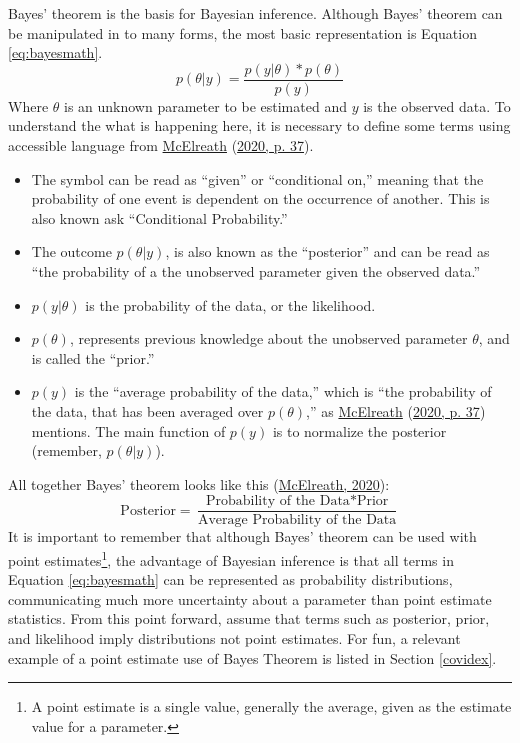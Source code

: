 \documentclass[12pt,twoside]{reedthesis}
\begin{document}
Bayes' theorem is the basis for Bayesian inference. Although Bayes' theorem can be manipulated in to many forms, the most basic representation is Equation \eqref{eq:bayesmath}.
\begin{equation}
p(\theta|y) = \frac{ p(y|\theta) * p(\theta)}{p(y)}
\label{eq:bayesmath}
\end{equation}
Where \(\theta\) is an unknown parameter to be estimated and \(y\) is the observed data. To understand the what is happening here, it is necessary to define some terms using accessible language from \protect\hyperlink{ref-mcelreathStatisticalRethinkingBayesian2020}{McElreath} (\protect\hyperlink{ref-mcelreathStatisticalRethinkingBayesian2020}{2020, p. 37}).
\begin{itemize}
\item
  The symbol \textbar{} can be read as ``given'' or ``conditional on,'' meaning that the probability of one event is dependent on the occurrence of another. This is also known ask ``Conditional Probability.''
\item
  The outcome \(p(\theta|y)\), is also known as the ``posterior'' and can be read as ``the probability of a the unobserved parameter given the observed data.''
\item
  \(p(y|\theta)\) is the probability of the data, or the likelihood.
\item
  \(p(\theta)\), represents previous knowledge about the unobserved parameter \(\theta\), and is called the ``prior.''
\item
  \(p(y)\) is the ``average probability of the data,'' which is ``the probability of the data, that has been averaged over \(p(\theta)\),'' as \protect\hyperlink{ref-mcelreathStatisticalRethinkingBayesian2020}{McElreath} (\protect\hyperlink{ref-mcelreathStatisticalRethinkingBayesian2020}{2020, p. 37}) mentions. The main function of \(p(y)\) is to normalize the posterior (remember, \(p(\theta|y)\)).
\end{itemize}
All together Bayes' theorem looks like this (\protect\hyperlink{ref-mcelreathStatisticalRethinkingBayesian2020}{McElreath, 2020}):
\begin{equation}
\text{Posterior} = \frac{\text{Probability of the Data} * \text{Prior}}{\text{Average Probability of the Data}}
\label{eq:bayesword}
\end{equation}
It is important to remember that although Bayes' theorem can be used with point estimates\footnote{A point estimate is a single value, generally the average, given as the estimate value for a parameter.}, the advantage of Bayesian inference is that all terms in Equation \eqref{eq:bayesmath} can be represented as probability distributions, communicating much more uncertainty about a parameter than point estimate statistics. From this point forward, assume that terms such as posterior, prior, and likelihood imply distributions not point estimates. For fun, a relevant example of a point estimate use of Bayes Theorem is listed in Section \ref{covidex}.
\end{document}
